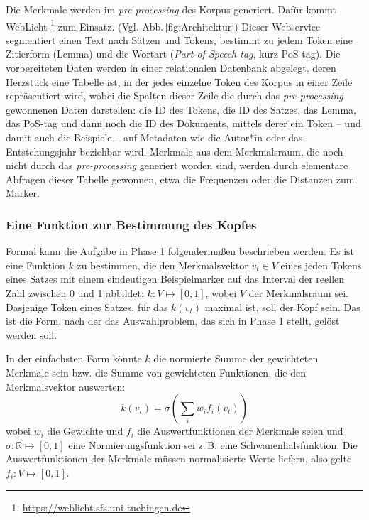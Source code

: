 \documentclass{article}
\newcommand*{\englisch}[1]{\foreignlanguage{english}{\textit{#1}}}%
\begin{document}
Die Merkmale werden im \englisch{pre-processing} des Korpus
generiert. Dafür kommt WebLicht%
\footnote{\url{https://weblicht.sfs.uni-tuebingen.de}} %
zum Einsatz. (Vgl. Abb.\,\ref{fig:Architektur}) Dieser Webservice
segmentiert einen Text nach Sätzen und Tokens, bestimmt zu jedem Token
eine Zitierform (Lemma) und die Wortart
(\englisch{Part-of-Speech-tag}, kurz PoS-tag). Die vorbereiteten Daten
werden in einer relationalen Datenbank abgelegt, deren Herzstück eine
Tabelle ist, in der jedes einzelne Token des Korpus in einer Zeile
repräsentiert wird, wobei die Spalten dieser Zeile die durch das
\englisch{pre-processing} gewonnenen Daten darstellen: die ID des
Tokens, die ID des Satzes, das Lemma, das PoS-tag und dann noch die ID
des Dokuments, mittels derer ein Token -- und damit auch die Beispiele
-- auf Metadaten wie die Autor*in oder das Entstehungsjahr beziehbar
wird. Merkmale aus dem Merkmalsraum, die noch nicht durch das
\englisch{pre-processing} generiert worden sind, werden durch
elementare Abfragen dieser Tabelle gewonnen, etwa die Frequenzen oder
die Distanzen zum Marker.


\subsubsection{Eine Funktion zur Bestimmung des Kopfes}

Formal kann die Aufgabe in Phase 1 folgendermaßen beschrieben
werden. Es ist eine Funktion $k$ zu bestimmen, die den Merkmalsvektor
$v_t\in V$ eines jeden Tokens eines Satzes mit einem eindeutigen
Beispielmarker auf das Interval der reellen Zahl zwischen 0 und 1
abbildet: $k:V \mapsto [0,1]$, wobei $V$ der Merkmalsraum sei. Dasjenige
Token eines Satzes, für das $k(v_t)$ maximal ist, soll der Kopf sein. Das
ist die Form, nach der das Auswahlproblem, das sich in Phase 1 stellt,
gelöst werden soll.

In der einfachsten Form könnte $k$ die normierte Summe der gewichteten
Merkmale sein bzw. die Summe von gewichteten Funktionen, die den
Merkmalsvektor auswerten:
\begin{equation}
\label{eq:EinfacheGewichteteSumme}
k(v_t) = \sigma \left( \sum\limits_iw_if_i(v_t) \right)
\end{equation}
wobei $w_i$ die Gewichte und $f_i$ die Auswertfunktionen der Merkmale
seien und $\sigma:\mathbb{R}\mapsto [0,1]$ eine Normierungsfunktion sei
z.\,B. eine Schwanenhalsfunktion. Die Auswertfunktionen der Merkmale
müssen normalisierte Werte liefern, also gelte $f_i:V\mapsto [0,1]$.
\end{document}
